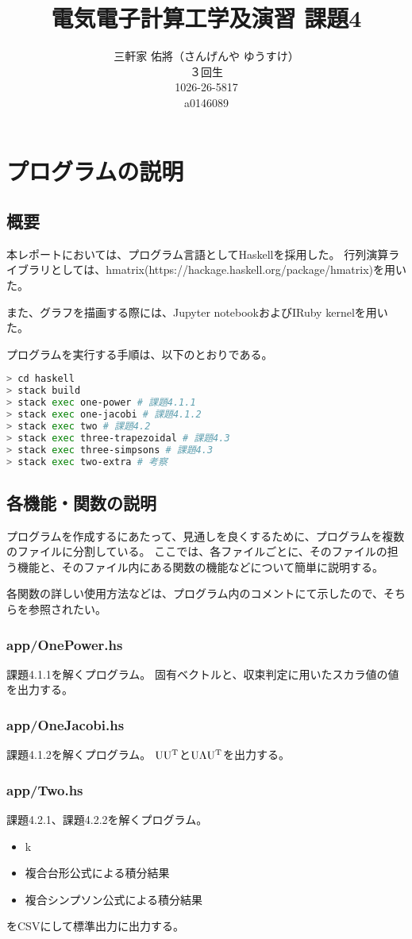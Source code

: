 \documentclass[11pt]{jsarticle}
\title{電気電子計算工学及演習 課題4}
\author{三軒家 佑將（さんげんや ゆうすけ） \\ ３回生 \\ 1026-26-5817 \\ a0146089}
\date{}
\begin{document}
\maketitle

\section{プログラムの説明}
\subsection{概要}
本レポートにおいては、プログラム言語としてHaskellを採用した。
行列演算ライブラリとしては、hmatrix(https://hackage.haskell.org/package/hmatrix)を用いた。

また、グラフを描画する際には、Jupyter notebookおよびIRuby kernelを用いた。

プログラムを実行する手順は、以下のとおりである。
\begin{lstlisting}[language=bash]
> cd haskell
> stack build
> stack exec one-power # 課題4.1.1
> stack exec one-jacobi # 課題4.1.2
> stack exec two # 課題4.2
> stack exec three-trapezoidal # 課題4.3
> stack exec three-simpsons # 課題4.3
> stack exec two-extra # 考察
\end{lstlisting}

\subsection{各機能・関数の説明}
プログラムを作成するにあたって、見通しを良くするために、プログラムを複数のファイルに分割している。
ここでは、各ファイルごとに、そのファイルの担う機能と、そのファイル内にある関数の機能などについて簡単に説明する。

各関数の詳しい使用方法などは、プログラム内のコメントにて示したので、そちらを参照されたい。

\subsubsection*{app/OnePower.hs}
課題4.1.1を解くプログラム。
固有ベクトルと、収束判定に用いたスカラ値の値を出力する。

\subsubsection*{app/OneJacobi.hs}
課題4.1.2を解くプログラム。
${\rm U} {\rm U}^{\rm T}$と${\rm U}\Lambda{\rm U}^{\rm T}$を出力する。

\subsubsection*{app/Two.hs}
課題4.2.1、課題4.2.2を解くプログラム。
\begin{itemize}
    \item k
    \item 複合台形公式による積分結果
    \item 複合シンプソン公式による積分結果
\end{itemize}
をCSVにして標準出力に出力する。
\end{document}
